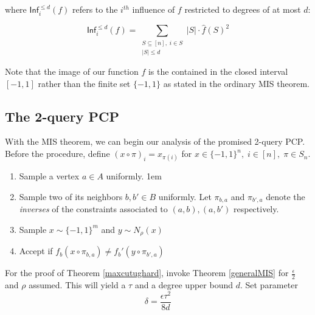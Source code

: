 where $\mathsf{Inf}^{\leq d}_i(f)$ refers to the $i^{th}$ influence of $f$ restricted to degrees of at most $d$:

\begin{equation}
  \mathsf{Inf}^{\leq d}_i(f) = \sum_{\substack{S \subseteq [n], \; i \in S \\ |S| \leq d}} |S|
  \cdot\widehat{f}(S)^2
\end{equation}

Note that the image of our function $f$ is the contained in the closed interval $[-1,1]$ rather than the finite set $\{-1, 1\}$ as stated in the ordinary MIS theorem.
%
%
%
\subsection{The 2-query PCP}
With the MIS theorem, we can begin our analysis of the promised 2-query PCP. Before the procedure, define $(x \circ \pi)_i = x_{\pi(i)}$ for $x \in \{-1,1\}^n, \; i \in [n], \; \pi \in S_n$.  \newline

\begin{enumerate}
  \item Sample a vertex $a \in A$ uniformly.
  \itemsep1em
  \item Sample two of its neighbors $b,b' \in B$ uniformly. Let $\pi_{b,a}$ and $\pi_{b',a}$ denote the \emph{inverses} of the constraints associated to $(a,b), (a,b')$ respectively.
  \item Sample $x \sim \{-1,1\}^m$ and $y \sim N_\rho(x)$
  \item Accept if $f_b(x \circ \pi_{b,a}) \neq f_b'(y \circ \pi_{b',a})$
\end{enumerate}

For the proof of Theorem \ref{maxcutughard}, invoke Theorem \ref{generalMIS} for $\frac{\epsilon}{2}$ and $\rho$ assumed. This will yield a $\tau$ and a degree upper bound $d$. Set parameter $$ \delta = \frac{\epsilon \tau^2}{8d} $$


